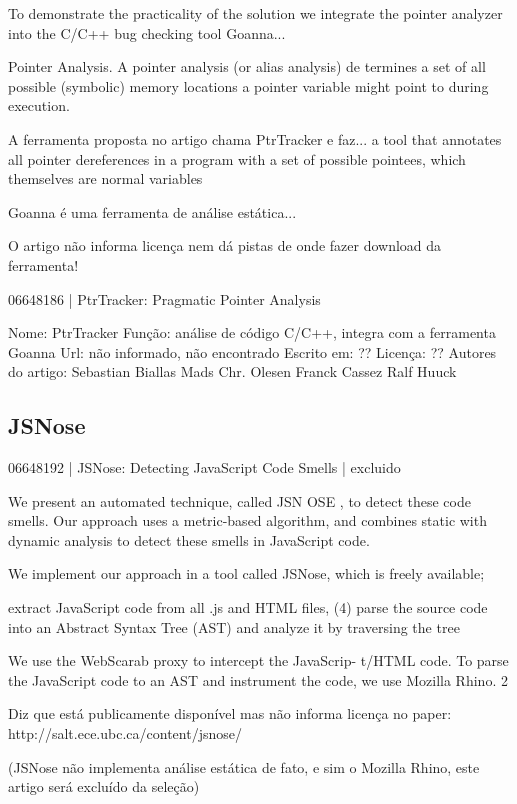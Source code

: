 To demonstrate the practicality of the solution we integrate the pointer
analyzer into the C/C++ bug checking tool Goanna...

Pointer Analysis. A pointer analysis (or alias analysis) de
termines a set of all possible (symbolic) memory locations a
pointer variable might point to during execution.

A ferramenta proposta no artigo chama PtrTracker e faz... a
tool that annotates all pointer dereferences in a program with a set of
possible pointees, which themselves are normal variables

Goanna é uma ferramenta de análise estática...

O artigo não informa licença nem dá pistas de onde fazer download da
ferramenta!

06648186 | PtrTracker: Pragmatic Pointer Analysis

Nome: PtrTracker
Função: análise de código C/C++, integra com a ferramenta Goanna
Url: não informado, não encontrado
Escrito em: ??
Licença: ??
Autores do artigo: Sebastian Biallas
                   Mads Chr. Olesen
                   Franck Cassez
                   Ralf Huuck

\subsection{JSNose}

06648192 | JSNose: Detecting JavaScript Code Smells | excluido

We present an automated
technique, called JSN OSE , to detect these code smells. Our
approach uses a metric-based algorithm, and combines static
with dynamic analysis to detect these smells in JavaScript
code.

We implement our approach in a tool called JSNose,
which is freely available;

extract JavaScript code from all .js and HTML
files, (4) parse the source code into an Abstract Syntax Tree
(AST) and analyze it by traversing the tree

We use the WebScarab proxy to intercept the JavaScrip-
t/HTML code. To parse the JavaScript code to an AST and
instrument the code, we use Mozilla Rhino. 2

Diz que está publicamente disponível mas não informa licença no paper:
http://salt.ece.ubc.ca/content/jsnose/

(JSNose não implementa análise estática de fato, e sim o Mozilla Rhino, este
artigo será excluído da seleção)

